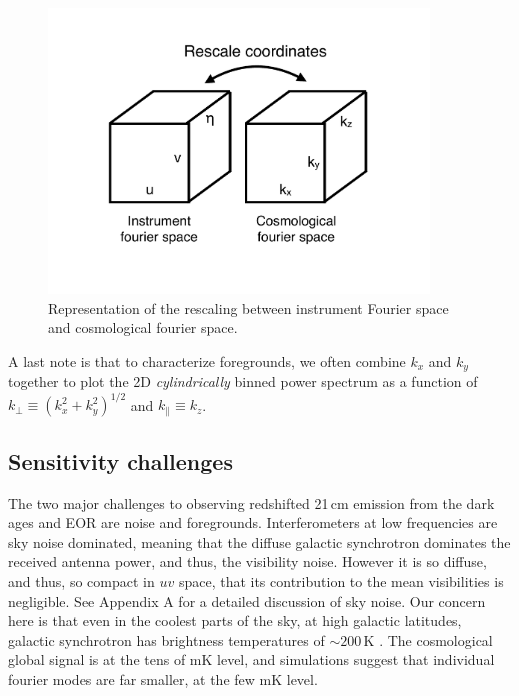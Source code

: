 {\begin{figure}[h]
    \centering
    \includegraphics[width=0.9\textwidth]{chap0_intro/ifo_space_cosmo.pdf}
    \caption{Representation of the rescaling between instrument Fourier space and cosmological fourier space.}
    \label{fig:ifospacecosmo}
\end{figure}

A last note is that to characterize foregrounds, we often combine $k_x$ and $k_y$ together to plot the 2D \textit{cylindrically} binned power spectrum as a function of $k_\perp\equiv(k_x^2+k_y^2)^{1/2}$ and $k_\parallel\equiv k_z$.




\subsection{Sensitivity challenges}
\label{sec:sensitivity}

The two major challenges to observing redshifted 21\,cm emission from the dark ages and EOR are noise and foregrounds. Interferometers at low frequencies are sky noise dominated, meaning that the diffuse galactic synchrotron dominates the received antenna power, and thus, the visibility noise. However it is so diffuse, and thus, so compact in $uv$ space, that its contribution to the mean visibilities is negligible. See Appendix A for a detailed discussion of sky noise. Our concern here is that even in the coolest parts of the sky, at high galactic latitudes, galactic synchrotron has brightness temperatures of $\sim200$\,K \citep{Tsysmemo}. The cosmological global signal is at the tens of mK level, and simulations suggest that individual fourier modes are far smaller, at the few mK level. 

}
